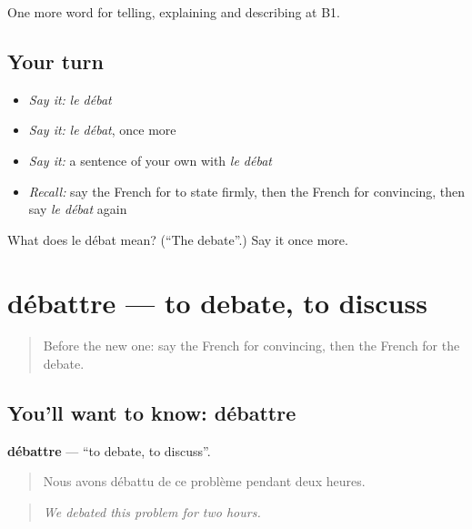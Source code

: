 \begin{grammarlens}[title={What you've built}]
One more word for telling, explaining and describing at B1.
\end{grammarlens}

\subsection*{Your turn}
\begin{itemize}
\raggedright
  \item \emph{Say it:} \emph{le débat}
  \item \emph{Say it:} \emph{le débat}, once more
  \item \emph{Say it:} a sentence of your own with \emph{le débat}
  \item \emph{Recall:} say the French for to state firmly, then the French for convincing, then say \emph{le débat} again
\end{itemize}

\begin{tcolorbox}[breakable,colback=teal!4,colframe=teal!35!black,title={Before you move on}]
What does le débat mean? (\textquotedblleft{}The debate\textquotedblright{}.) Say it once more.
\end{tcolorbox}
\section[débattre]{débattre — to debate, to discuss}

\label{lesson:FR-C335-debattre}



\begin{quote}
Before the new one: say the French for convincing, then the French for the debate.
\end{quote}

\subsection*{You'll want to know: débattre}
\textbf{débattre} — \textquotedblleft{}to debate, to discuss\textquotedblright{}.

\begin{quote}
Nous avons débattu de ce problème pendant deux heures.
\end{quote}

\begin{quote}
\emph{We debated this problem for two hours.}
\end{quote}

